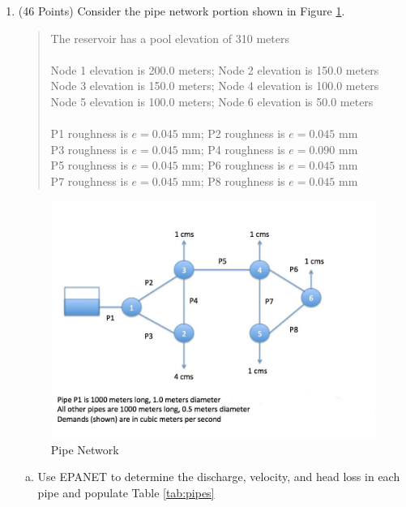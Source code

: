 \documentclass[12pt]{article}
\begin{document}
\begin{enumerate}

\item \label{prob:EPANET} (46 Points) Consider the pipe network portion shown in Figure \ref{fig:Pipes}.
\begin{quote}
The reservoir has a pool elevation of 310 meters\\
\\
Node 1 elevation is 200.0 meters; Node 2 elevation is 150.0 meters\\
Node 3 elevation is 150.0 meters; Node 4 elevation is 100.0 meters\\
Node 5 elevation is 100.0 meters; Node 6 elevation is 50.0 meters\\
\\
P1 roughness is $e=0.045$ mm; P2  roughness is $e=0.045$ mm\\
P3 roughness is $e=0.045$ mm; P4  roughness is $e=0.090$ mm\\
P5 roughness is $e=0.045$ mm; P6  roughness is $e=0.045$ mm\\
P7 roughness is $e=0.045$ mm; P8  roughness is $e=0.045$ mm\\

\end{quote}
\begin{figure}[h!] %
\centering
   \includegraphics[width=6.5in]{2018Pipeline.jpg}
   \caption{Pipe Network}
   \label{fig:Pipes} 
\end{figure}
\clearpage

\begin{enumerate}[a)]
\item Use EPANET to determine the discharge, velocity, and head loss in each pipe and populate Table \ref{tab:pipes}


\end{enumerate}
\end{enumerate}
\end{document}
